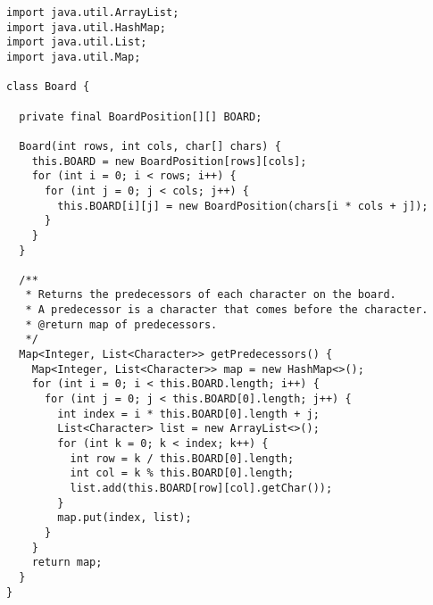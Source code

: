 \enlargethispage{-4\baselineskip}
\begin{lstlisting}[language=MyJava]
import java.util.ArrayList;
import java.util.HashMap;
import java.util.List;
import java.util.Map;

class Board {

  private final BoardPosition[][] BOARD;

  Board(int rows, int cols, char[] chars) {
    this.BOARD = new BoardPosition[rows][cols];
    for (int i = 0; i < rows; i++) {
      for (int j = 0; j < cols; j++) {
        this.BOARD[i][j] = new BoardPosition(chars[i * cols + j]);
      }
    }
  }

  /**
   * Returns the predecessors of each character on the board.
   * A predecessor is a character that comes before the character.
   * @return map of predecessors.
   */
  Map<Integer, List<Character>> getPredecessors() {
    Map<Integer, List<Character>> map = new HashMap<>();
    for (int i = 0; i < this.BOARD.length; i++) {
      for (int j = 0; j < this.BOARD[0].length; j++) {
        int index = i * this.BOARD[0].length + j;
        List<Character> list = new ArrayList<>();
        for (int k = 0; k < index; k++) {
          int row = k / this.BOARD[0].length;
          int col = k % this.BOARD[0].length;
          list.add(this.BOARD[row][col].getChar());
        }
        map.put(index, list);
      }
    }
    return map;
  }
}
\end{lstlisting}








